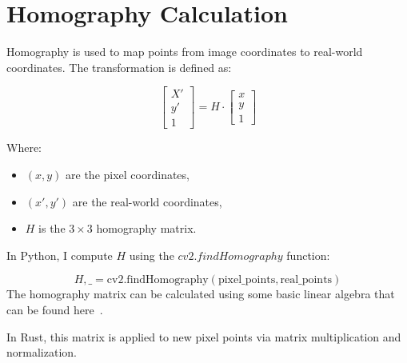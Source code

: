 \section{Homography Calculation}\label{sec:homography-calculation}

Homography is used to map points from image coordinates to real-world coordinates.
The transformation is defined as:

\begin{equation}
    \begin{bmatrix}
        X' \\
        y' \\
        1
    \end{bmatrix}
    = H \cdot
    \begin{bmatrix}
        x \\
        y \\
        1
    \end{bmatrix}\label{eq:homography}
\end{equation}

Where:
\begin{itemize}
    \item \( (x, y) \) are the pixel coordinates,
    \item \( (x', y') \) are the real-world coordinates,
    \item \( H \) is the \( 3 \times 3 \) homography matrix.
\end{itemize}

In Python, I compute \( H \) using the $cv2.findHomography$ function:


\[
    H, \text{\_} = \text{cv2.findHomography}(\text{pixel\_points}, \text{real\_points})
\]
The homography matrix can be calculated using some basic linear algebra that can be found here~\autocite{homography}.

In Rust, this matrix is applied to new pixel points via matrix multiplication and normalization.



